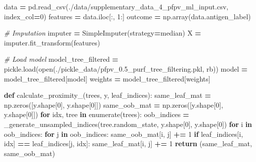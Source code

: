 \documentclass[
  11pt,
  oneside]{book}
\newenvironment{Shaded}{\begin{snugshade}}{\end{snugshade}}
\newcommand{\BuiltInTok}[1]{#1}
\newcommand{\CommentTok}[1]{\textcolor[rgb]{0.56,0.35,0.01}{\textit{#1}}}
\newcommand{\ControlFlowTok}[1]{\textcolor[rgb]{0.13,0.29,0.53}{\textbf{#1}}}
\newcommand{\DecValTok}[1]{\textcolor[rgb]{0.00,0.00,0.81}{#1}}
\newcommand{\KeywordTok}[1]{\textcolor[rgb]{0.13,0.29,0.53}{\textbf{#1}}}
\newcommand{\NormalTok}[1]{#1}
\newcommand{\OperatorTok}[1]{\textcolor[rgb]{0.81,0.36,0.00}{\textbf{#1}}}
\newcommand{\StringTok}[1]{\textcolor[rgb]{0.31,0.60,0.02}{#1}}
\begin{document}
\begin{Shaded}
\begin{Highlighting}[]
\NormalTok{data }\OperatorTok{=}\NormalTok{ pd.read\_csv(}\StringTok{\textquotesingle{}./data/supplementary\_data\_4\_pfpv\_ml\_input.csv\textquotesingle{}}\NormalTok{, index\_col}\OperatorTok{=}\DecValTok{0}\NormalTok{)}
\NormalTok{features }\OperatorTok{=}\NormalTok{ data.iloc[:, }\DecValTok{1}\NormalTok{:]}
\NormalTok{outcome }\OperatorTok{=}\NormalTok{ np.array(data.antigen\_label)}

\CommentTok{\# Imputation}
\NormalTok{imputer }\OperatorTok{=}\NormalTok{ SimpleImputer(strategy}\OperatorTok{=}\StringTok{\textquotesingle{}median\textquotesingle{}}\NormalTok{)}
\NormalTok{X }\OperatorTok{=}\NormalTok{ imputer.fit\_transform(features)}

\CommentTok{\# Load model}
\NormalTok{model\_tree\_filtered }\OperatorTok{=}\NormalTok{ pickle.load(}\BuiltInTok{open}\NormalTok{(}\StringTok{\textquotesingle{}./pickle\_data/pfpv\_0.5\_purf\_tree\_filtering.pkl\textquotesingle{}}\NormalTok{, }\StringTok{\textquotesingle{}rb\textquotesingle{}}\NormalTok{))}
\NormalTok{model }\OperatorTok{=}\NormalTok{ model\_tree\_filtered[}\StringTok{\textquotesingle{}model\textquotesingle{}}\NormalTok{]}
\NormalTok{weights }\OperatorTok{=}\NormalTok{ model\_tree\_filtered[}\StringTok{\textquotesingle{}weights\textquotesingle{}}\NormalTok{]}

\KeywordTok{def}\NormalTok{ calculate\_proximity\_(trees, y, leaf\_indices):}
\NormalTok{    same\_leaf\_mat }\OperatorTok{=}\NormalTok{ np.zeros([y.shape[}\DecValTok{0}\NormalTok{], y.shape[}\DecValTok{0}\NormalTok{]])}
\NormalTok{    same\_oob\_mat }\OperatorTok{=}\NormalTok{ np.zeros([y.shape[}\DecValTok{0}\NormalTok{], y.shape[}\DecValTok{0}\NormalTok{]])}
    \ControlFlowTok{for}\NormalTok{ idx, tree }\KeywordTok{in} \BuiltInTok{enumerate}\NormalTok{(trees):}
\NormalTok{        oob\_indices }\OperatorTok{=}\NormalTok{ \_generate\_unsampled\_indices(tree.random\_state, y.shape[}\DecValTok{0}\NormalTok{], y.shape[}\DecValTok{0}\NormalTok{])}
        \ControlFlowTok{for}\NormalTok{ i }\KeywordTok{in}\NormalTok{ oob\_indices:}
            \ControlFlowTok{for}\NormalTok{ j }\KeywordTok{in}\NormalTok{ oob\_indices:}
\NormalTok{                same\_oob\_mat[i, j] }\OperatorTok{+=} \DecValTok{1}
                \ControlFlowTok{if}\NormalTok{ leaf\_indices[i, idx] }\OperatorTok{==}\NormalTok{ leaf\_indices[j, idx]:}
\NormalTok{                    same\_leaf\_mat[i, j] }\OperatorTok{+=} \DecValTok{1}
    \ControlFlowTok{return}\NormalTok{ (same\_leaf\_mat, same\_oob\_mat)}


\end{Highlighting}
\end{Shaded}
\end{document}
